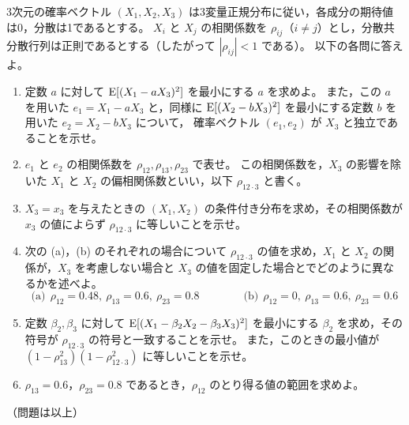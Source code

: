 \documentclass[a4paper,11pt]{ltjsarticle}
\begin{document}
3次元の確率ベクトル $(X_1,X_2,X_3)$ は3変量正規分布に従い，各成分の期待値は0，分散は1であるとする。
$X_i$ と $X_j$ の相関係数を $\rho_{ij}$（$i\ne j$）とし，分散共分散行列は正則であるとする（したがって $|\rho_{ij}|<1$ である）。
以下の各問に答えよ。
\begin{enumerate}
\item 定数 $a$ に対して $\operatorname{E}[(X_1-aX_3)^2]$ を最小にする $a$ を求めよ。
また，この $a$ を用いた $e_1=X_1-aX_3$ と，同様に $\operatorname{E}[(X_2-bX_3)^2]$ を最小にする定数 $b$ を用いた $e_2=X_2-bX_3$ について，
確率ベクトル $(e_1,e_2)$ が $X_3$ と独立であることを示せ。
\item $e_1$ と $e_2$ の相関係数を $\rho_{12},\rho_{13},\rho_{23}$ で表せ。
この相関係数を，$X_3$ の影響を除いた $X_1$ と $X_2$ の偏相関係数といい，以下 $\rho_{12\cdot3}$ と書く。
\item $X_3=x_3$ を与えたときの $(X_1,X_2)$ の条件付き分布を求め，その相関係数が $x_3$ の値によらず $\rho_{12\cdot3}$ に等しいことを示せ。
\item 次の (a)，(b) のそれぞれの場合について $\rho_{12\cdot3}$ の値を求め，$X_1$ と $X_2$ の関係が，$X_3$ を考慮しない場合と $X_3$ の値を固定した場合とでどのように異なるかを述べよ。
\[
\text{(a)}\ \ \rho_{12}=0.48,\ \rho_{13}=0.6,\ \rho_{23}=0.8\qquad\qquad
\text{(b)}\ \ \rho_{12}=0,\ \rho_{13}=0.6,\ \rho_{23}=0.6
\]
\item 定数 $\beta_2,\beta_3$ に対して $\operatorname{E}[(X_1-\beta_2X_2-\beta_3X_3)^2]$ を最小にする $\beta_2$ を求め，その符号が $\rho_{12\cdot3}$ の符号と一致することを示せ。
また，このときの最小値が $(1-\rho_{13}^2)(1-\rho_{12\cdot3}^2)$ に等しいことを示せ。
\item $\rho_{13}=0.6$，$\rho_{23}=0.8$ であるとき，$\rho_{12}$ のとり得る値の範囲を求めよ。
\end{enumerate}
\vfill
\begin{center}（問題は以上）\end{center}
\end{document}
